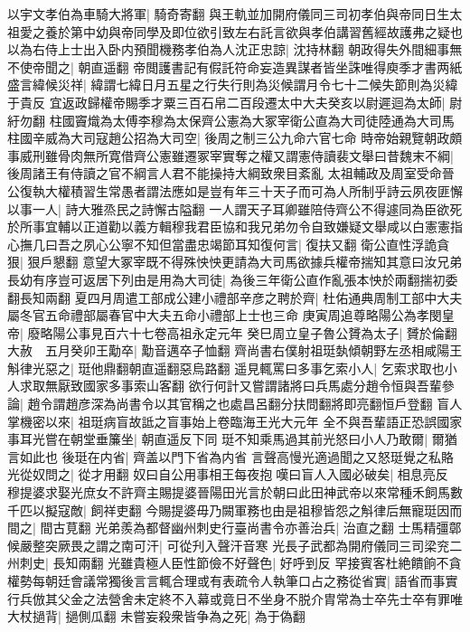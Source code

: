 以宇文孝伯為車騎大將軍|{
	騎奇寄翻}
與王軌並加開府儀同三司初孝伯與帝同日生太祖愛之養於第中幼與帝同學及即位欲引致左右託言欲與孝伯講習舊經故護弗之疑也以為右侍上士出入卧内預聞機務孝伯為人沈正忠諒|{
	沈持林翻}
朝政得失外間細事無不使帝聞之|{
	朝直遥翻}
帝閲護書記有假託符命妄造異謀者皆坐誅唯得庾季才書两紙盛言緯候災祥|{
	緯謂七緯日月五星之行失行則為災候謂月令七十二候失節則為災緯于貴反}
宜返政歸權帝賜季才粟三百石帛二百段遷太中大夫癸亥以尉遲迴為太師|{
	尉紆勿翻}
柱國竇熾為太傅李穆為太保齊公憲為大冢宰衛公直為大司徒陸通為大司馬柱國辛威為大司寇趙公招為大司空|{
	後周之制三公九命六官七命}
時帝始親覽朝政頗事威刑雖骨肉無所寛借齊公憲雖遷冢宰實奪之權又謂憲侍讀裴文舉曰昔魏末不綱|{
	後周諸王有侍讀之官不綱言人君不能操持大綱致衆目紊亂}
太祖輔政及周室受命晉公復執大權積習生常愚者謂法應如是豈有年三十天子而可為人所制乎詩云夙夜匪懈以事一人|{
	詩大雅烝民之詩懈古隘翻}
一人謂天子耳卿雖陪侍齊公不得遽同為臣欲死於所事宜輔以正道勸以義方輯穆我君臣協和我兄弟勿令自致嫌疑文舉咸以白憲憲指心撫几曰吾之夙心公寧不知但當盡忠竭節耳知復何言|{
	復扶又翻}
衛公直性浮詭貪狠|{
	狠戶懇翻}
意望大冢宰既不得殊怏怏更請為大司馬欲據兵權帝揣知其意曰汝兄弟長幼有序豈可返居下列由是用為大司徒|{
	為後三年衛公直作亂張本怏於兩翻揣初委翻長知兩翻}
夏四月周遣工部成公建小禮部辛彦之聘於齊|{
	杜佑通典周制工部中大夫屬冬官五命禮部屬春官中大夫五命小禮部上士也三命}
庚寅周追尊略陽公為孝閔皇帝|{
	廢略陽公事見百六十七卷高祖永定元年}
癸巳周立皇子魯公贇為太子|{
	贇於倫翻}
大赦　五月癸卯王勱卒|{
	勱音邁卒子恤翻}
齊尚書右僕射祖珽埶傾朝野左丞相咸陽王斛律光惡之|{
	珽他鼎翻朝直遥翻惡烏路翻}
遥見輒罵曰多事乞索小人|{
	乞索求取也小人求取無厭致國家多事索山客翻}
欲行何計又嘗謂諸將曰兵馬處分趙令恒與吾輩參論|{
	趙令謂趙彦深為尚書令以其官稱之也處昌呂翻分扶問翻將即亮翻恒戶登翻}
盲人掌機密以來|{
	祖珽病盲故詆之盲事始上卷臨海王光大元年}
全不與吾輩語正恐誤國家事耳光嘗在朝堂垂簾坐|{
	朝直遥反下同}
珽不知乘馬過其前光怒曰小人乃敢爾|{
	爾猶言如此也}
後珽在内省|{
	齊盖以門下省為内省}
言聲高慢光適過聞之又怒珽覺之私賂光從奴問之|{
	從才用翻}
奴曰自公用事相王每夜抱嘆曰盲人入國必破矣|{
	相息亮反}
穆提婆求娶光庶女不許齊主賜提婆晉陽田光言於朝曰此田神武帝以來常種禾飼馬數千匹以擬寇敵|{
	飼祥吏翻}
今賜提婆毋乃闕軍務也由是祖穆皆怨之斛律后無寵珽因而間之|{
	間古莧翻}
光弟羨為都督幽州刺史行臺尚書令亦善治兵|{
	治直之翻}
士馬精彊鄣候嚴整突厥畏之謂之南可汗|{
	可從刋入聲汗音寒}
光長子武都為開府儀同三司梁兖二州刺史|{
	長知兩翻}
光雖貴極人臣性節儉不好聲色|{
	好呼到反}
罕接賓客杜絶饋餉不貪權勢每朝廷會議常獨後言言輒合理或有表疏令人執筆口占之務從省實|{
	語省而事實}
行兵倣其父金之法營舍未定終不入幕或竟日不坐身不脱介胄常為士卒先士卒有罪唯大杖撾背|{
	撾側瓜翻}
未嘗妄殺衆皆争為之死|{
	為于偽翻}
